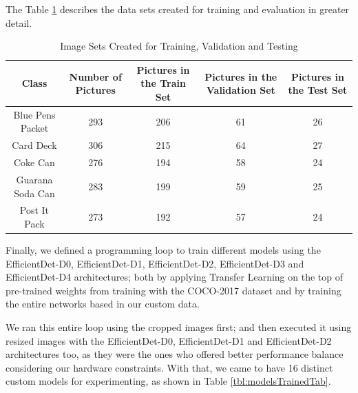 \documentclass[openright]{normas-utf-tex} %
\begin{document}
The Table \ref{tbl:imageSetsTab} describes the data sets created for training and evaluation in greater detail.

\begin{table}[H]
	\centering
	\begin{adjustbox}{width=1\textwidth}
	\label{tab:imageSets}
	\begin{tabular}{c|c|c|c|c}
		\hline 
		Class & Number of Pictures & Pictures in the Train Set & Pictures in the Validation Set & Pictures in the Test Set \\
		\hline
        Blue Pens Packet & 293 & 206 & 61 & 26\\
		Card Deck & 306 & 215 & 64 & 27\\
		Coke Can & 276 & 194 & 58 & 24\\
		Guarana Soda Can & 283 & 199 & 59 & 25\\
		Post It Pack & 273 & 192 & 57 & 24\\
		\hline 
	\end{tabular}
	\end{adjustbox}
	\caption[Image Sets Created for Training, Validation and Testing]{Image Sets Created for Training, Validation and Testing}
	\label{tbl:imageSetsTab}
\end{table}

Finally, we defined a programming loop to train different models using the EfficientDet-D0,
EfficientDet-D1, EfficientDet-D2, EfficientDet-D3 and EfficientDet-D4 architectures; both by
applying Transfer Learning on the top of pre-trained weights from training with the COCO-2017 dataset 
and by training the entire networks based in our custom data. 

We ran this entire loop using the cropped images first; and then executed it using resized images with the EfficientDet-D0,
EfficientDet-D1 and EfficientDet-D2 architectures too, as they were the ones who offered better
performance balance considering our hardware constraints. 
With that, we came to have 16 distinct custom models for experimenting, as shown in Table \ref{tbl:modelsTrainedTab}.
\end{document}
